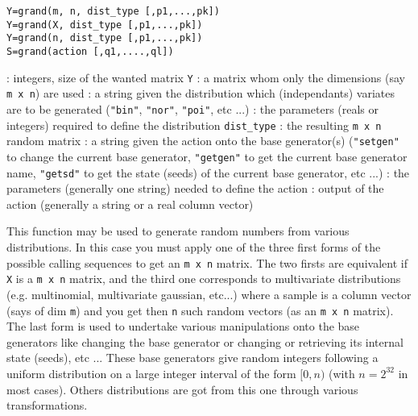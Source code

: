\begin{mandesc}
\end{mandesc}
\begin{calling_sequence}
\begin{verbatim}
Y=grand(m, n, dist_type [,p1,...,pk])  
Y=grand(X, dist_type [,p1,...,pk])  
Y=grand(n, dist_type [,p1,...,pk])  
S=grand(action [,q1,....,ql])  
\end{verbatim}
\end{calling_sequence}
\begin{parameters}
  \begin{varlist}
    : integers, size of the wanted matrix \verb!Y!
   : a matrix whom only the dimensions (say \verb!m x n!) are used
   : a string given the distribution which (independants) variates are to be 
     generated (\verb!"bin"!, \verb!"nor"!, \verb!"poi"!, etc ...)
   : the parameters (reals or integers) required to define the distribution 
    \verb!dist_type!
   : the resulting \verb!m x n! random matrix
   : a string given the action onto the base generator(s) (\verb!"setgen"! to change the current base 
     generator,  \verb!"getgen"! to get the current base generator name, \verb!"getsd"! to get the 
     state (seeds) of the current base generator, etc ...)
    : the parameters (generally one string) needed to define the action
    : output of the action (generally a string or a real column vector)
  \end{varlist}
  \end{parameters}
  
\begin{mandescription}
  This function may be used to generate random numbers from various distributions. In this 
  case you must apply one of the three first forms of the possible
  calling sequences to get an \verb!m x n! matrix. 
  The two firsts are equivalent if \verb!X! is a \verb!m x n! matrix, 
  and the third one corresponds to multivariate distributions (e.g. multinomial, multivariate
  gaussian, etc...) where a sample is a column vector (says of dim \verb!m!)
  and you get then \verb!n! such random vectors (as an \verb!m x n! matrix). 
  The last form is used to undertake various manipulations onto the base generators
  like changing the base generator or changing or retrieving its internal state (seeds), 
  etc ... These base generators give random integers following a
  uniform distribution on a large integer interval of the form $[0,n)$
  (with $n=2^{32}$ in most cases). Others distributions are got from
  this one through various transformations.
\end{mandescription}

